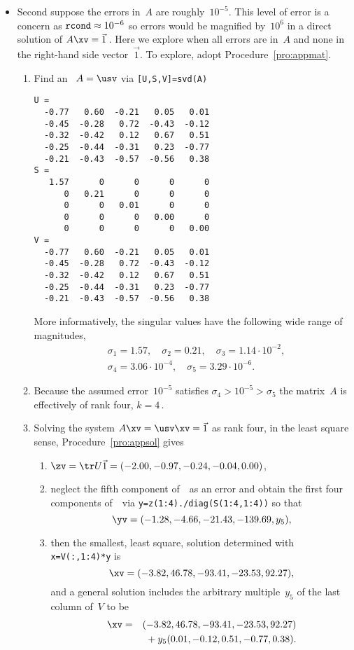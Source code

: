 \begin{example}
\begin{solution}
\begin{itemize}
\item Second suppose the errors in~\(A\) are roughly~\(10^{-5}\).
This level of error is a concern as \(\verb|rcond|\approx10^{-6}\) so errors would be magnified by~\(10^6\) in a direct solution of \(A\xv=\vec1\)\,.
Here we explore when all errors are in~\(A\) and none in the right-hand side vector~\(\vec 1\).
To explore, adopt Procedure~\ref{pro:appmat}.
\begin{enumerate}
\item Find an \svd\ \(A=\usv\) via \verb|[U,S,V]=svd(A)| \twodp
\begin{verbatim}
U =
  -0.77   0.60  -0.21   0.05   0.01
  -0.45  -0.28   0.72  -0.43  -0.12
  -0.32  -0.42   0.12   0.67   0.51
  -0.25  -0.44  -0.31   0.23  -0.77
  -0.21  -0.43  -0.57  -0.56   0.38
S =
   1.57      0      0      0      0
      0   0.21      0      0      0
      0      0   0.01      0      0
      0      0      0   0.00      0
      0      0      0      0   0.00
V =
  -0.77   0.60  -0.21   0.05   0.01
  -0.45  -0.28   0.72  -0.43  -0.12
  -0.32  -0.42   0.12   0.67   0.51
  -0.25  -0.44  -0.31   0.23  -0.77
  -0.21  -0.43  -0.57  -0.56   0.38
\end{verbatim}
More informatively, the singular values have the following wide range of magnitudes, 
\begin{eqnarray*}
&&\sigma_1=1.57,\quad
\sigma_2=0.21,\quad
\sigma_3=1.14\cdot10^{-2},\quad
\\&&
\sigma_4=3.06\cdot10^{-4},\quad
\sigma_5=3.29\cdot10^{-6}.
\end{eqnarray*}
\item Because the assumed error~\(10^{-5}\) satisfies \(\sigma_4>10^{-5}>\sigma_5\) the matrix~\(A\) is effectively of rank four, \(k=4\)\,.
\item Solving the system \(A\xv=\usv\xv=\vec1\) as rank four, in the least square sense, Procedure~\ref{pro:appsol} gives \twodp
\begin{enumerate}
\item \(\zv=\tr U\vec1=(-2.00,-0.97,-0.24,-0.04,0.00)\),
\item neglect the fifth component of~\zv\ as an error and obtain the first four components of~\yv\ via \verb|y=z(1:4)./diag(S(1:4,1:4))| so that
\begin{equation*}
\yv=(-1.28,-4.66,-21.43,-139.69,y_5),
\end{equation*}

\item then the smallest, least square, solution determined with 
\verb|x=V(:,1:4)*y| is
\begin{equation*}
\xv=(-3.82,46.78,-93.41,-23.53,92.27),
\end{equation*}
and a general solution includes the arbitrary multiple~\(y_5\) of the last column of~\(V\) to be
\begin{eqnarray*}
\xv&=&(-3.82,46.78,-93.41,-23.53,92.27)
\\&&{}+y_5(0.01,-0.12,0.51,-0.77,0.38).
\end{eqnarray*}
\end{enumerate}
\end{enumerate}


\end{itemize}
\end{solution}
\end{example}
